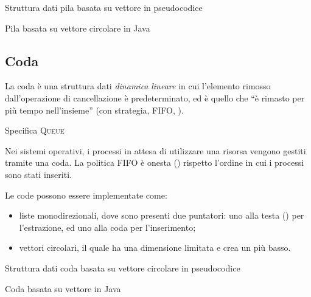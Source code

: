\begin{algorithm}[H]
	\caption{Struttura dati pila basata su vettore in pseudocodice}
	
\end{algorithm}

\begin{listing}[hp]
	\caption{Pila basata su vettore circolare in Java}
	\label{lst:vector-stack}
\end{listing}

\clearpage
\subsection{Coda}

La coda è una struttura dati \emph{dinamica} \emph{lineare} in cui l'elemento rimosso dall'operazione di cancellazione è predeterminato, ed è quello che \enquote{è rimasto per più tempo nell'insieme} (con strategia, \textsc{FIFO}, ).

\begin{algorithm}[H]
	\caption[Specifica coda]{Specifica \textsc{Queue}}
	
\end{algorithm}

Nei sistemi operativi, i processi in attesa di utilizzare una risorsa vengono gestiti tramite una coda.
La politica \textsc{FIFO} è onesta () rispetto l'ordine in cui i processi sono stati inseriti.

Le code possono essere implementate come:
\begin{itemize}
	\item liste monodirezionali, dove sono presenti due puntatori: uno alla testa () per l'estrazione, ed uno alla coda per l'inserimento;
	\item vettori circolari, il quale ha una dimensione limitata e crea un  più basso.
\end{itemize}

\begin{algorithm}[H]
	\caption{Struttura dati coda basata su vettore circolare in pseudocodice}
	
\end{algorithm}

\begin{listing}[hp]
	\caption{Coda basata su vettore in Java}%
	\label{lst:vector-queue}
\end{listing}

\ifsubfile

\fi
